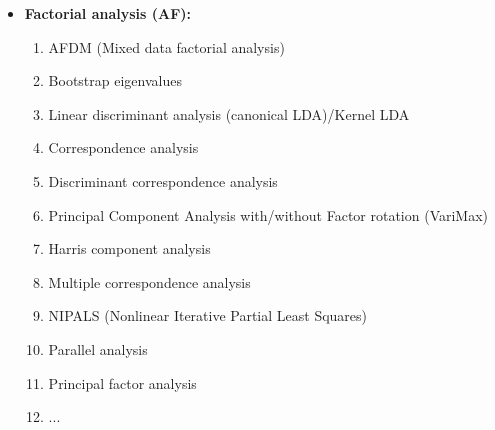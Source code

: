 \begin{itemize}
		\item \textbf{Factorial analysis (AF):}
		\begin{enumerate}
			\item AFDM (Mixed data  factorial analysis)
			\item Bootstrap eigenvalues
			\item Linear discriminant analysis (canonical LDA)/Kernel LDA
			\item Correspondence analysis
			\item Discriminant correspondence analysis
			\item Principal Component Analysis with/without Factor rotation (VariMax)
			\item Harris component analysis
			\item Multiple correspondence analysis
			\item NIPALS (Nonlinear Iterative Partial Least Squares)
			\item Parallel analysis
			\item Principal factor analysis
			\item ...
		\end{enumerate}
		

\end{itemize}
